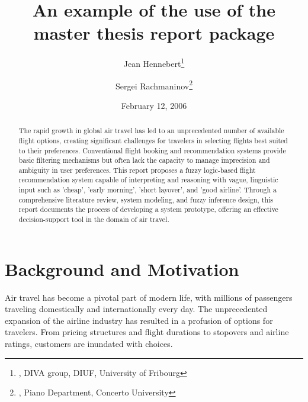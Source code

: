 \documentclass[a4paper]{article}
\begin{document}
\title{An example of the use of the master thesis report package}

\author{Jean Hennebert\thanks{, DIVA group, DIUF, University of Fribourg}
   \and Sergei Rachmaninov\thanks{, Piano Department, Concerto University}}

\date{February 12, 2006} %

%

\maketitle

\begin{abstract}
The rapid growth in global air travel has led to an unprecedented number of available flight options, creating significant challenges for travelers in selecting flights best suited to their preferences. Conventional flight booking and recommendation systems provide basic filtering mechanisms but often lack the capacity to manage imprecision and ambiguity in user preferences. This report proposes a fuzzy logic-based flight recommendation system capable of interpreting and reasoning with vague, linguistic input such as 'cheap', 'early morning', 'short layover', and 'good airline'. Through a comprehensive literature review, system modeling, and fuzzy inference design, this report documents the process of developing a system prototype, offering an effective decision-support tool in the domain of air travel.

\end{abstract}

\newpage
\tableofcontents
\newpage

\section{Background and Motivation}
Air travel has become a pivotal part of modern life, with millions of passengers traveling domestically and internationally every day. The unprecedented expansion of the airline industry has resulted in a profusion of options for travelers. From pricing structures and flight durations to stopovers and airline ratings, customers are inundated with choices.
\end{document}
